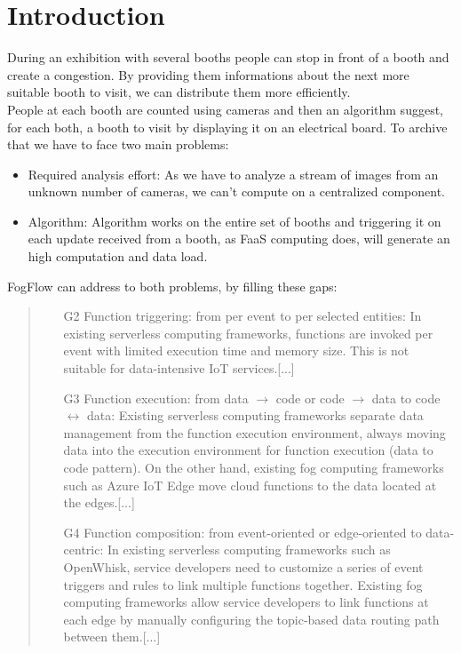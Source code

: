 \documentclass[11pt]{article}
\begin{document}
\section{Introduction}
During an exhibition with several booths people can stop in front of a booth and create a congestion. By providing them informations about the next more suitable booth to visit, we can distribute them more efficiently.\\
People at each booth are counted using cameras and then an algorithm suggest, for each both, a booth to visit by displaying it on an electrical board.
To archive that we have to face two main problems:
\begin{itemize}
    \item Required analysis effort: As we have to analyze a stream of images from an unknown number of cameras, we can't compute on a centralized component.
    \item Algorithm: Algorithm works on the entire set of booths and triggering it on each update received from a booth, as FaaS computing does, will generate an high computation and data load.
\end{itemize}{}
FogFlow can address to both problems, by filling these gaps:\\
\begin{quote}
    \begin{enumerate}
        \item[G2] Function triggering: from per event to per selected entities: In existing serverless computing frameworks, functions are invoked per event with limited execution time and memory size. This is not suitable for data-intensive IoT services.[...]
        \item[G3] Function execution: from data $\rightarrow$ code or code $\rightarrow$ data to code $\leftrightarrow$ data: Existing serverless computing frameworks separate data management from the function execution environment, always moving data into the execution environment for function execution (data to code pattern). On the other hand, existing fog computing frameworks such as Azure IoT Edge move cloud functions to the data located at the edges.[...]
        \item[G4] Function composition: from event-oriented or edge-oriented to data-centric: 
        In existing serverless computing frameworks such as OpenWhisk, service developers need to customize a series of event triggers and rules to link multiple functions together. Existing fog computing frameworks allow service developers to link functions at each edge by manually configuring the topic-based data routing path between them.[...]
    \end{enumerate}{}
\end{quote}
\end{document}
